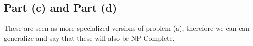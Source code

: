 \documentclass[12pt]{article}
\begin{document}
\subsection{Part (c) and Part (d)}
These are seen as more specialized versions of problem (a), therefore we can can generalize
and say that these will also be NP-Complete.


\end{document}
